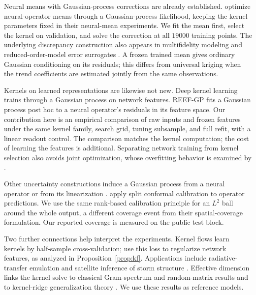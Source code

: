 Neural means with Gaussian-process corrections are already established.
\citet{mora2025operator} optimize neural-operator means through a
Gaussian-process likelihood, keeping the kernel parameters fixed in their
neural-mean experiments. We fit the mean first, select the kernel on
validation, and solve
the correction at all $19000$ training points. The underlying discrepancy
construction also appears in multifidelity modeling
\citep{kennedy2000predicting} and reduced-order-model error surrogates
\citep{drohmann2015romes}. A frozen trained mean gives ordinary Gaussian
conditioning on its residuals; this differs from universal kriging when
the trend coefficients are estimated jointly from the same observations.

Kernels on learned representations are likewise not new. Deep kernel
learning \citep{wilson2016deep,calandra2016manifold} trains through a
Gaussian process on network features. REEF-GP \citep{vendrell2026geometry}
fits a Gaussian process post hoc to a neural operator's residuals in its
feature space. Our contribution here is an empirical comparison of raw
inputs and frozen features under the same kernel family, search grid,
tuning subsample, and full refit, with a linear readout control. The comparison matches the kernel computation; the cost of learning the features is additional.
Separating network training from kernel selection also avoids joint
optimization, whose overfitting behavior is examined by
\citet{ober2021promises}.

Other uncertainty constructions induce a Gaussian process from a neural
operator \citep{kumar2024neural} or from its linearization
\citep{magnani2025linearization}. \citet{ma2024calibrated} apply split
conformal calibration to operator predictions. We use the same rank-based
calibration principle for an $L^2$ ball around the whole output, a different
coverage event from their spatial-coverage formulation. Our reported
coverage is measured on the public test block.

Two further connections help interpret the experiments. Kernel flows
\citep{owhadi2019kernel} learn kernels by half-sample cross-validation;
\citet{yoo2021deep} use this loss to regularize network features, as analyzed
in Proposition~\ref{prop:kf}. Applications include radiative-transfer
emulation \citep{susiluoto2025radiative} and satellite inference of storm
structure \citep{prasanth2021kernel}. Effective dimension links the kernel
solve to classical Gram-spectrum and random-matrix results
\citep{koltchinskii2000random,marchenko1967distribution,baik2005phase}
and to kernel-ridge generalization theory \citep{caponnetto2007optimal}.
We use these results as reference models.

